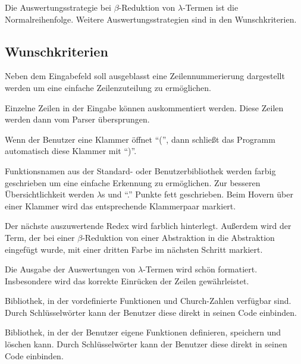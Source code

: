 \documentclass[parskip=full,11pt,twoside]{scrartcl}
\begin{document}
Die Auswertungsstrategie bei $\beta$-Reduktion von $\lambda$-Termen ist die Normalreihenfolge. Weitere Auswertungsstrategien sind in den Wunschkriterien.


\newpage
\subsection{Wunschkriterien}

Neben dem Eingabefeld soll ausgeblasst eine Zeilennummerierung dargestellt werden um eine einfache Zeilenzuteilung zu ermöglichen.

Einzelne Zeilen in der Eingabe können auskommentiert werden. Diese Zeilen werden dann vom Parser übersprungen.

Wenn der Benutzer eine Klammer öffnet \enquote{(}, dann schließt das Programm automatisch diese Klammer mit \enquote{)}.

Funktionsnamen aus der Standard- oder Benutzerbibliothek werden farbig geschrieben um eine einfache Erkennung zu ermöglichen. Zur besseren Übersichtlichkeit werden $\lambda$s  und \enquote{.} Punkte fett geschrieben. Beim Hovern über einer Klammer wird das entsprechende Klammerpaar markiert.

Der nächste auszuwertende Redex wird farblich hinterlegt.
Außerdem wird der Term, der bei einer $\beta$-Reduktion von einer Abstraktion in die Abstraktion eingefügt wurde, mit einer dritten Farbe im nächsten Schritt markiert.

Die Ausgabe der Auswertungen von $\lambda$-Termen wird schön formatiert. Insbesondere wird das korrekte Einrücken der Zeilen gewährleistet.

Bibliothek, in der vordefinierte Funktionen und Church-Zahlen verfügbar sind. Durch Schlüsselwörter kann der Benutzer diese direkt in seinen Code einbinden.

Bibliothek, in der der Benutzer eigene Funktionen definieren, speichern und löschen kann. Durch Schlüsselwörter kann der Benutzer diese direkt in seinen Code einbinden.
\end{document}
